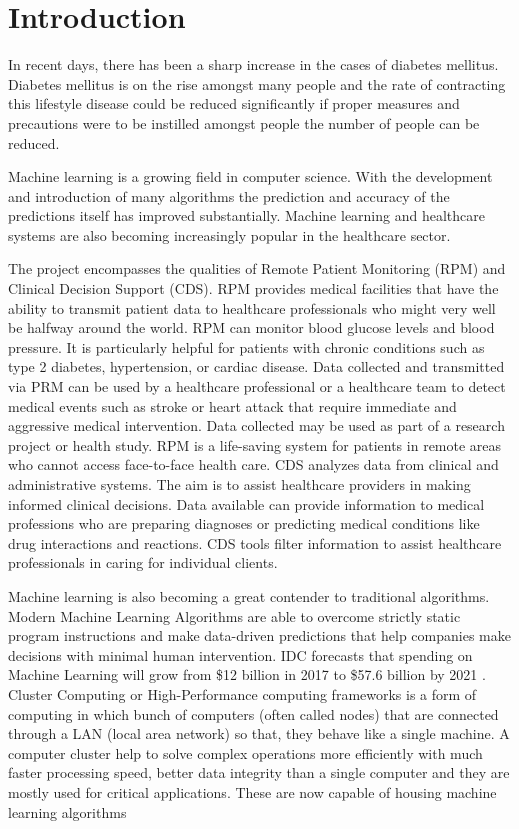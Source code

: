 \documentclass[12pt]{article}
\begin{document}
\section{Introduction}
In recent days, there has been a sharp increase in the cases of diabetes mellitus. Diabetes mellitus is on the rise amongst many people and the rate of contracting this lifestyle disease could be reduced significantly if proper measures and precautions were to be instilled amongst people the number of people can be reduced.

Machine learning is a growing field in computer science. With the development and introduction of many algorithms the prediction and accuracy of the predictions itself has improved substantially. Machine learning and healthcare systems are also becoming increasingly popular in the healthcare sector.

The project encompasses the qualities of Remote Patient Monitoring (RPM)\cite{rpm} and Clinical Decision Support (CDS)\cite{cds}. RPM provides medical facilities that have the ability to transmit patient data to healthcare professionals who might very well be halfway around the world. RPM can monitor blood glucose levels and blood pressure. It is particularly helpful for patients with chronic conditions such as type 2 diabetes, hypertension, or cardiac disease. Data collected and transmitted via PRM can be used by a healthcare professional or a healthcare team to detect medical events such as stroke or heart attack that require immediate and aggressive medical intervention. Data collected may be used as part of a research project or health study. RPM is a life-saving system for patients in remote areas who cannot access face-to-face health care. CDS analyzes data from clinical and administrative systems. The aim is to assist healthcare providers in making informed clinical decisions. Data available can provide information to medical professions who are preparing diagnoses or predicting medical conditions like drug interactions and reactions. CDS tools filter information to assist healthcare professionals in caring for individual clients. 

Machine learning is also becoming a great contender to traditional algorithms. Modern Machine Learning Algorithms are able to overcome strictly static program instructions and make data-driven predictions that help companies make decisions with minimal human intervention. IDC forecasts that spending on Machine Learning will grow from \$12 billion in 2017 to \$57.6 billion by 2021 \cite{dzone}. Cluster Computing or High-Performance computing frameworks is a form of computing in which bunch of computers (often called nodes) that are connected through a LAN (local area network) so that, they behave like a single machine. A computer cluster help to solve complex operations more efficiently with much faster processing speed, better data integrity than a single computer and they are mostly used for critical applications. These are now capable of housing machine learning algorithms
\end{document}
